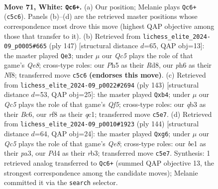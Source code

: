 \documentclass[11pt]{article}
\begin{document}
\clearpage

\begin{figure}[p]\centering
\begin{subfigure}{0.46\textwidth}\centering
\resizebox{\linewidth}{!}{%
\newchessgame
\chessboard[
  setfen={5r1r/p5p1/k6p/2Qp3P/p2P2P1/1q2P3/7N/4b2K w - - 50 71},
  showmover=false,
  pgfstyle=straightmove, color=movearrow, markmove={c5-c6}
]}
\caption{}
\end{subfigure}\hfill
\begin{subfigure}{0.46\textwidth}\centering
\resizebox{\linewidth}{!}{%
\newchessgame
\chessboard[
  setfen={3r1n1k/3P2p1/2BQ1p1p/p4P2/4P1PP/8/5RK1/4q3 b - - 6 74},
  showmover=false,
  pgfstyle=straightmove, color=movearrow, markmove={e1-e3}
]}
\caption{}
\end{subfigure}
\\[4pt]
\begin{subfigure}{0.46\textwidth}\centering
\resizebox{\linewidth}{!}{%
\newchessgame
\chessboard[
  setfen={8/6pk/2b1p3/1pP1P1pP/1P3qP1/2R4K/8/2Q5 b - - 11 72},
  showmover=false,
  pgfstyle=straightmove, color=movearrow, markmove={f4-b4}
]}
\caption{}
\end{subfigure}\hfill
\begin{subfigure}{0.46\textwidth}\centering
\resizebox{\linewidth}{!}{%
\newchessgame
\chessboard[
  setfen={4Q3/1kp5/6p1/5p1p/2q4P/pr4P1/5P2/5RK1 w - - 0 73},
  showmover=false,
  pgfstyle=straightmove, color=movearrow, markmove={e8-g6}
]}
\caption{}
\end{subfigure}
\caption{\textbf{Move 71, White: \texttt{Qc6+}.} (a) Our position; Melanie plays \texttt{Qc6+} (\texttt{c5c6}). Panels (b)--(d) are the retrieved master positions whose correspondence most drove this move (highest QAP objective among those that transfer to it). (b) Retrieved from \texttt{lichess\_elite\_2024-09\_p0005\#665} (ply 147) [structural distance $d$=65, QAP obj=13]: the master played \texttt{Qe3}; under $\mu$ our \emph{Qc5} plays the role of that game's \emph{Qe8}; cross-type roles: our \emph{P}h5 as their \emph{R}d8, our \emph{p}h6 as their \emph{N}f8; transferred move \texttt{c5c6} \textbf{(endorses this move)}. (c) Retrieved from \texttt{lichess\_elite\_2024-09\_p0022\#2694} (ply 143) [structural distance $d$=53, QAP obj=25]: the master played \texttt{Qxb4}; under $\mu$ our \emph{Qc5} plays the role of that game's \emph{Qf5}; cross-type roles: our \emph{q}b3 as their \emph{B}c6, our \emph{r}f8 as their \emph{q}c1; transferred move \texttt{c5e7}. (d) Retrieved from \texttt{lichess\_elite\_2024-09\_p0010\#1923} (ply 144) [structural distance $d$=64, QAP obj=24]: the master played \texttt{Qxg6}; under $\mu$ our \emph{Qc5} plays the role of that game's \emph{Qe8}; cross-type roles: our \emph{b}e1 as their \emph{p}a3, our \emph{P}d4 as their \emph{r}b3; transferred move \texttt{c5e7}. Synthesis: 1 retrieved analog transferred to \texttt{Qc6+} (summed QAP objective 13, the strongest correspondence among the candidate moves); Melanie committed it via the \texttt{search} selector.}
\label{fig:thought-m140}
\end{figure}
\end{document}
